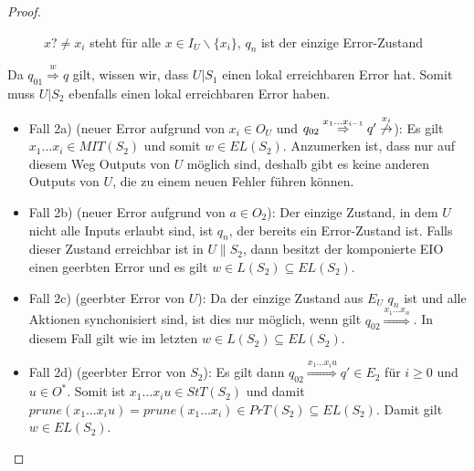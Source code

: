 \begin{proof}
\begin{itemize}
\begin{figure} [h!tbp]
\begin{center}
        \caption{$x?\neq x_i$ steht für alle $x\in I_U\backslash\{x_i\}$, $q_n$
          ist der einzige Error-Zustand}
        \label{UmitE}
      \end{center}
      \end{figure}
      Da $q_{01} \overset{w}{\Rightarrow} q$ gilt, wissen wir, dass $U|S_1$
      einen lokal erreichbaren Error hat. Somit muss $U|S_2$ ebenfalls einen
      lokal erreichbaren Error haben.
      \begin{itemize}
        \item Fall 2a) (neuer Error aufgrund von $x_i\in O_U$ und $q_{02}
          \overset{x_1\dots x_{i-1}}{\Rightarrow} q'
          \overset{x_i}{\not{\hspace{-0.1cm}\rightarrow}}$): Es gilt $x_1\dots
          x_i\in MIT(S_2)$ und somit $w\in EL(S_2)$. Anzumerken ist, dass nur
          auf diesem Weg Outputs von $U$ möglich sind, deshalb gibt es keine
          anderen Outputs von $U$, die zu einem neuen Fehler führen können.
        \item Fall 2b) (neuer Error aufgrund von $a\in O_2$): Der einzige
          Zustand, in dem $U$ nicht alle Inputs erlaubt sind, ist $q_n$, der
          bereits ein Error-Zustand ist. Falls dieser Zustand erreichbar ist in
          $U\|S_2$, dann besitzt der komponierte EIO einen geerbten Error und
          es gilt $w\in L(S_2)\subseteq EL(S_2)$.
        \item Fall 2c) (geerbter Error von $U$): Da der einzige Zustand aus
          $E_U$ $q_n$ ist und alle Aktionen synchonisiert sind, ist dies nur
          möglich, wenn gilt $q_{02} \overset{x_1\dots x_n}{\Rightarrow}$. In
          diesem Fall gilt wie im letzten $w\in L(S_2)\subseteq EL(S_2)$.
        \item Fall 2d) (geerbter Error von $S_2$): Es gilt dann $q_{02}
          \overset{x_1\dots x_iu}{\Rightarrow} q'\in E_2$ für $i\geq 0$ und
          $u\in O^*$. Somit ist $x_1\dots x_iu\in StT(S_2)$ und damit
          $prune(x_1\dots x_iu)=prune(x_1\dots x_i)\in PrT(S_2)\subseteq
          EL(S_2)$. Damit gilt $w\in EL(S_2)$.
      \end{itemize}
  \end{itemize}
\end{proof}

